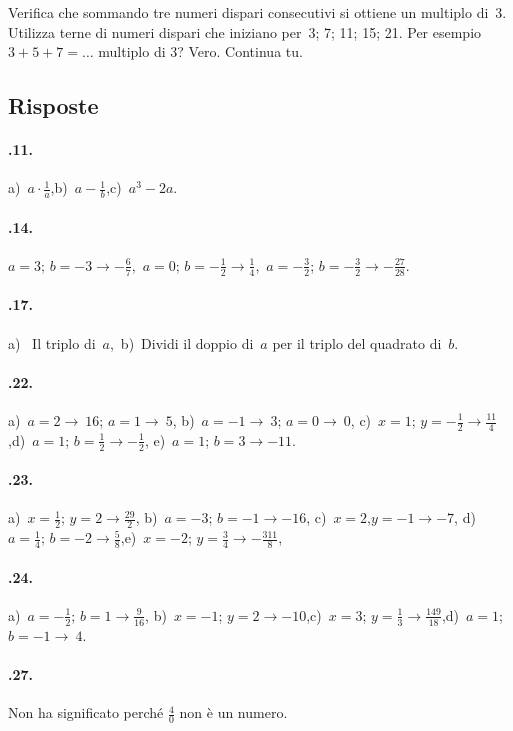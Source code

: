 \begin{esercizio}
 \label{ese:8.32}
 Verifica che sommando tre numeri dispari consecutivi si ottiene un
multiplo di~3. Utilizza terne di numeri dispari che iniziano per~3;
7; 11; 15; 21. Per esempio~$3+5+7= \ldots$ multiplo di 3? Vero. Continua tu.
\end{esercizio}

\subsection{Risposte}
\begin{multicols}{2}
\paragraph{\thechapter.11.}
a)~$a \cdot\frac{1}{a}$,\quad b)~$a-\frac{1}{b}$,\quad c)~$a^3-2a$.
\paragraph{\thechapter.14.} $a=3$; $b=-3\rightarrow -\frac{6}{7}$,\quad~$a=0$; $b=-\frac{1}{2}\rightarrow \frac{1}{4}$,\quad~$a=-\frac{3}{2}$; $b=-\frac{3}{2}\rightarrow -\frac{27}{28}$.
\paragraph{\thechapter.17.}
a)~ Il triplo di~$a$,\quad ~b)~Dividi il doppio di~$a$ per il triplo del quadrato di~$b$.
\paragraph{\thechapter.22.}
a)~$a=2 \rightarrow~16$; $a=1 \rightarrow~5$, \quad b)~$a=-1 \rightarrow~3$; $a=0 \rightarrow~0$,
c)~$x=1$; $y=-\frac{1}{2} \rightarrow \frac{11}{4}$,\quad d)~$a=1$; $b=\frac{1}{2}\rightarrow -\frac{1}{2}$, \quad e)~$a=1$; $b=3 \rightarrow -11$.
\paragraph{\thechapter.23.}
a)~$x=\frac{1}{2}$; $y=2 \rightarrow \frac{29}{2}$, \quad b)~$a=-3$; $b=-1 \rightarrow -16$, \quad c)~$x=2$,$y=-1 \rightarrow -7$,
d)~$a=\frac{1}{4}$; $b=-2 \rightarrow \frac{5}{8}$,\quad e)~$x=-2$; $y=\frac{3}{4} \rightarrow -\frac{311}8{}$,\quad
\paragraph{\thechapter.24.}
a)~$a=-\frac{1}{2}$; $b=1 \rightarrow \frac{9}{16}$,
b)~$x=-1$; $y=2 \rightarrow -10$,\quad c)~$x=3$; $y=\frac{1}{3} \rightarrow \frac{149}{18}$,\quad d)~$a=1$; $b=-1 \rightarrow~4$.
\paragraph{\thechapter.27.} Non ha significato perché $\frac{4}{0}$ non è un numero.
\end{multicols}
